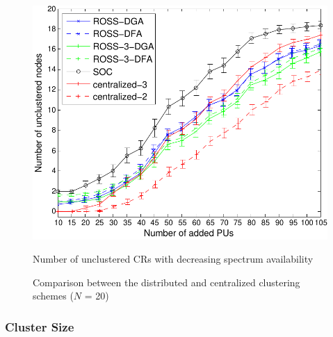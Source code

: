 \documentclass[10pt,journal,compsoc]{IEEEtran}
\theoremstyle{mytheoremstyle}
\theoremstyle{mytheoremstyle}
\theoremstyle{mytheoremstyle}
\begin{document}
\begin{figure}[th]
\begin{multicols}{3}
    \includegraphics[width=\linewidth]{survival_rate_20.pdf}\par\caption{Number of unclustered CRs with decreasing spectrum availability}\label{singleton_clusters}
\end{multicols}
\caption{Comparison between the distributed and centralized clustering schemes ($N$ = 20)}
\label{compare_dis_centralized}
\end{figure}



\subsubsection{Cluster Size}
\label{cluster_size}
\end{document}
